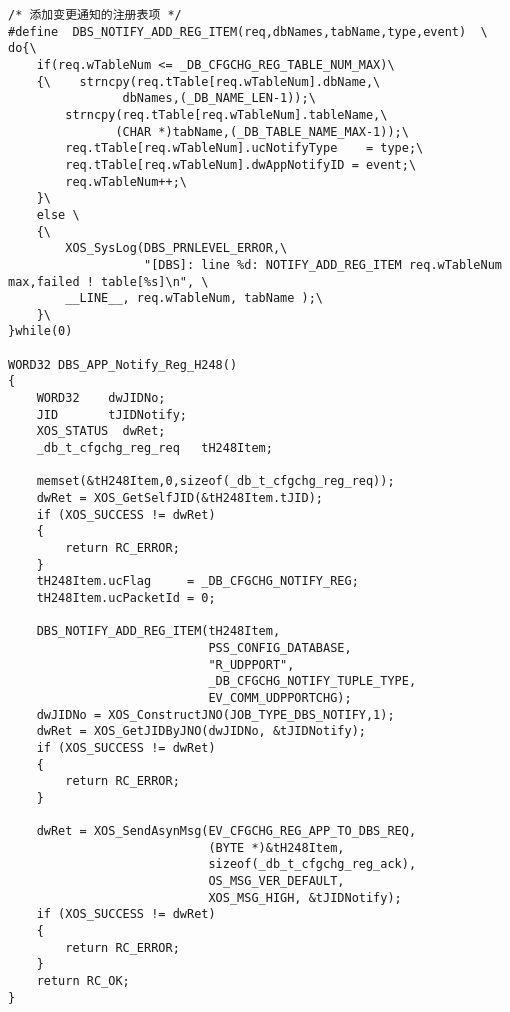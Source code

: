 ﻿\documentclass  [11pt,twocolumn]{article}
\begin{document}
\begin{lstlisting}
/* 添加变更通知的注册表项 */
#define  DBS_NOTIFY_ADD_REG_ITEM(req,dbNames,tabName,type,event)  \
do{\
    if(req.wTableNum <= _DB_CFGCHG_REG_TABLE_NUM_MAX)\
    {\    strncpy(req.tTable[req.wTableNum].dbName,\
                dbNames,(_DB_NAME_LEN-1));\
        strncpy(req.tTable[req.wTableNum].tableName,\
               (CHAR *)tabName,(_DB_TABLE_NAME_MAX-1));\
        req.tTable[req.wTableNum].ucNotifyType    = type;\
        req.tTable[req.wTableNum].dwAppNotifyID = event;\
        req.wTableNum++;\
    }\
    else \
    {\
        XOS_SysLog(DBS_PRNLEVEL_ERROR,\
                   "[DBS]: line %d: NOTIFY_ADD_REG_ITEM req.wTableNum max,failed ! table[%s]\n", \
        __LINE__, req.wTableNum, tabName );\
    }\
}while(0)

WORD32 DBS_APP_Notify_Reg_H248()
{
    WORD32    dwJIDNo;
    JID       tJIDNotify;
    XOS_STATUS  dwRet;
    _db_t_cfgchg_reg_req   tH248Item;
    
    memset(&tH248Item,0,sizeof(_db_t_cfgchg_reg_req));
    dwRet = XOS_GetSelfJID(&tH248Item.tJID);
    if (XOS_SUCCESS != dwRet)
    {
        return RC_ERROR;
    }
    tH248Item.ucFlag     = _DB_CFGCHG_NOTIFY_REG;
    tH248Item.ucPacketId = 0;
    
    DBS_NOTIFY_ADD_REG_ITEM(tH248Item, 
                            PSS_CONFIG_DATABASE, 
                            "R_UDPPORT", 
                            _DB_CFGCHG_NOTIFY_TUPLE_TYPE, 
                            EV_COMM_UDPPORTCHG);
    dwJIDNo = XOS_ConstructJNO(JOB_TYPE_DBS_NOTIFY,1);
    dwRet = XOS_GetJIDByJNO(dwJIDNo, &tJIDNotify);
    if (XOS_SUCCESS != dwRet)
    {
        return RC_ERROR;
    }

    dwRet = XOS_SendAsynMsg(EV_CFGCHG_REG_APP_TO_DBS_REQ,
                            (BYTE *)&tH248Item, 
                            sizeof(_db_t_cfgchg_reg_ack),
                            OS_MSG_VER_DEFAULT,
                            XOS_MSG_HIGH, &tJIDNotify);
    if (XOS_SUCCESS != dwRet)
    {
        return RC_ERROR;
    }
    return RC_OK;
}
\end{lstlisting}

\subsection{}
\end{document}
